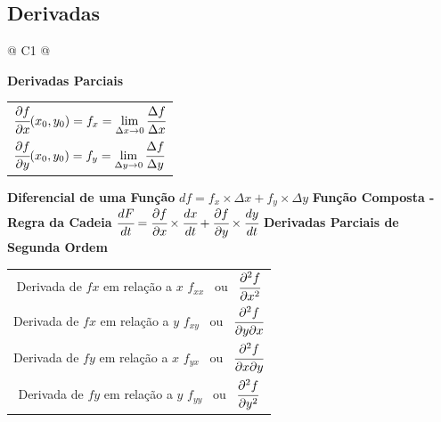 	\subsection{Derivadas}

		\begin{longtable}{
		@{}
		C{1\textwidth} 
		@{}}

			\toprule
			\textbf{Derivadas Parciais}
			\tabularnewline
			\midrule
			{\large \begin{tabular}[c]{@{}c@{}}

				$\cfrac{\partial f}{\partial x} (x_{0}, y_{0}) = f_{x} = \lim \limits_{\Delta x \to 0} \cfrac{\Delta f}{\Delta x}$ \\

				$\cfrac{\partial f}{\partial y} (x_{0}, y_{0}) = f_{y} = \lim \limits_{\Delta y \to 0} \cfrac{\Delta f}{\Delta y}$

			\end{tabular}}
			\tabularnewline
			\midrule
			\textbf{Diferencial de uma Função}
			\tabularnewline
			\midrule
			{\large $df = f_{x} \times \Delta x + f_{y} \times \Delta y$}
			\tabularnewline
			\midrule
			\textbf{Função Composta - Regra da Cadeia}
			\tabularnewline
			\midrule
			{\large $\cfrac{dF}{dt} = \cfrac{\partial f}{\partial x} \times \cfrac{dx}{dt} + \cfrac{\partial f}{\partial y} \times \cfrac{dy}{dt}$}
			\tabularnewline
			\midrule
			\textbf{Derivadas Parciais de Segunda Ordem}
			\tabularnewline
			\midrule
			{\large \begin{tabular}[c]{@{}c@{}}

				Derivada de $fx$ em relação a $x$ \hspace{1cm} $f_{xx}$ \ ou \ $\cfrac{\partial^{2}f}{\partial x^{2}}$ \\

				Derivada de $fx$ em relação a $y$ \hspace{1cm} $f_{xy}$ \ ou \ $\cfrac{\partial^{2}f}{\partial y\partial x}$ \\

				Derivada de $fy$ em relação a $x$ \hspace{1cm} $f_{yx}$ \ ou \ $\cfrac{\partial^{2}f}{\partial x\partial y}$ \\

				Derivada de $fy$ em relação a $y$ \hspace{1cm} $f_{yy}$ \ ou \ $\cfrac{\partial^{2}f}{\partial y^{2}}$

			\end{tabular}}
            \tabularnewline
			\bottomrule

		\end{longtable}

